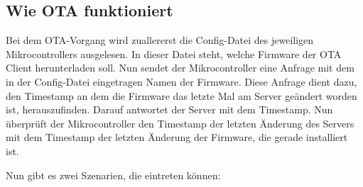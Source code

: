 \subsection*{Wie OTA funktioniert}
Bei dem OTA-Vorgang wird zuallererst die Config-Datei des jeweiligen Mikrocontrollers ausgelesen. In dieser Datei steht, welche Firmware der OTA Client herunterladen soll. Nun sendet der Mikrocontroller eine Anfrage mit dem in der Config-Datei eingetragen Namen der Firmware. Diese Anfrage dient dazu, den Timestamp an dem die Firmware das letzte Mal am Server geändert worden ist, herauszufinden.\newline
Darauf antwortet der Server mit dem Timestamp.\newline
Nun überprüft der Mikrocontroller den Timestamp der letzten Änderung des Servers mit dem Timestamp der letzten Änderung der Firmware, die gerade installiert ist.\newline

Nun gibt es zwei Szenarien, die eintreten können:

